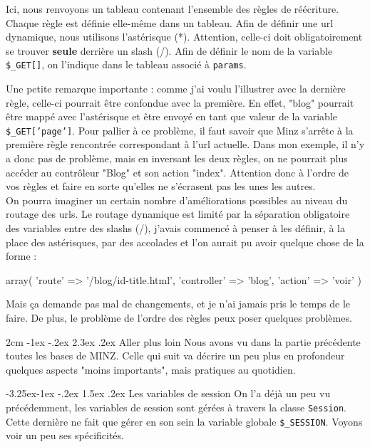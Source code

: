 \documentclass[a4paper,11pt]{article}
\makeatletter
\renewcommand\section{\@startsection{section}{1}{\z@}%
	{2cm \@plus -1ex \@minus -.2ex}%
	{2.3ex \@plus.2ex}%
	{\color{bleuClair}\reset@font\Large\bfseries}}
\renewcommand{\subsection}{\@startsection{subsection}{2}{\z@}%
             {-3.25ex\@plus -1ex \@minus -.2ex}%
             {1.5ex \@plus .2ex}%
             {\color{bleuFonce}\normalfont\large\bfseries}}
\makeatother
\begin{document}
Ici, nous renvoyons un tableau contenant l'ensemble des règles de réécriture. Chaque règle est définie elle-même dans un tableau. Afin de définir une url dynamique, nous utilisons l'astérisque (*). Attention, celle-ci doit obligatoirement se trouver \textbf{seule} derrière un slash (/). Afin de définir le nom de la variable \texttt{\$\_GET[]}, on l'indique dans le tableau associé à \texttt{params}.

Une petite remarque importante : comme j'ai voulu l'illustrer avec la dernière règle, celle-ci pourrait être confondue avec la première. En effet, "blog" pourrait être mappé avec l'astérisque et être envoyé en tant que valeur de la variable \texttt{\$\_GET['page']}. Pour pallier à ce problème, il faut savoir que Minz s'arrête à la première règle rencontrée correspondant à l'url actuelle. Dans mon exemple, il n'y a donc pas de problème, mais en inversant les deux règles, on ne pourrait plus accéder au contrôleur "Blog" et son action "index". Attention donc à l'ordre de vos règles et faire en sorte qu'elles ne s'écrasent pas les unes les autres.\\

On pourra imaginer un certain nombre d'améliorations possibles au niveau du routage des urls. Le routage dynamique est limité par la séparation obligatoire des variables entre des slashs (/), j'avais commencé à penser à les définir, à la place des astérisques, par des accolades et l'on aurait pu avoir quelque chose de la forme :
\begin{PHP}
array(
  'route'       => '/blog/{id}-{title}.html',
  'controller'  => 'blog',
  'action'      => 'voir'
)
\end{PHP}
Mais ça demande pas mal de changements, et je n'ai jamais pris le temps de le faire. De plus, le problème de l'ordre des règles peux poser quelques problèmes.

\newpage

\section{Aller plus loin}
Nous avons vu dans la partie précédente toutes les bases de MINZ. Celle qui suit va décrire un peu plus en profondeur quelques aspects "moins importants", mais pratiques au quotidien.

\subsection{Les variables de session}
On l'a déjà un peu vu précédemment, les variables de session sont gérées à travers la classe \texttt{Session}. Cette dernière ne fait que gérer en son sein la variable globale \texttt{\$\_SESSION}. Voyons voir un peu ses spécificités.\\
\end{document}
